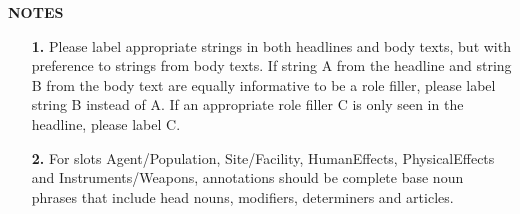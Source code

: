 {\bf NOTES}
\begin{enumerate}
\item[{\bf 1.}] Please label appropriate strings in both headlines and body texts, 
but with preference to strings from body texts. 
If string A from the headline and string B from the body text are equally informative 
to be a role filler, please label string B instead of A. If an appropriate role filler C
is only seen in the headline, please label C. 
\item[{\bf 2.}] For slots Agent/Population, Site/Facility, HumanEffects, PhysicalEffects and 
Instruments/Weapons, annotations should be complete base noun phrases that include 
head nouns, modifiers, determiners and articles. 
\end{enumerate}
